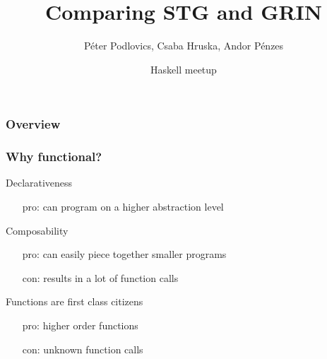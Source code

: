 \documentclass[bigger,aspectratio=169]{beamer}
\title[STG vs GRIN] %
{Comparing STG and GRIN}
\author[P. Podlovics, Cs. Hruska, Andor Pénzes ] %
{Péter Podlovics, Csaba Hruska, Andor Pénzes}
\institute[ELTE] %
{
	Eötvös Loránd University (ELTE), \\ Budapest, Hungary
}
\date{Haskell meetup} %
\begin{document}
{
	\frame{\vspace{2cm}\titlepage}
}

\begin{frame}
	\frametitle{Overview}
	\tableofcontents
\end{frame}

\begin{frame}[fragile]
\frametitle{Why functional?}

\begin{vfitemize}
	\item Declarativeness
	\begin{itemize}
		\item[pro:] can program on a higher abstraction level
	\end{itemize}
	\item Composability\\
	\begin{itemize}
		\item[pro:] can easily piece together smaller programs
		\item[con:] results in a lot of function calls
	\end{itemize}
	\item Functions are first class citizens
	\begin{itemize}
		\item[pro:] higher order functions
		\item[con:] unknown function calls
	\end{itemize}
\end{vfitemize}

\end{frame}
\end{document}
